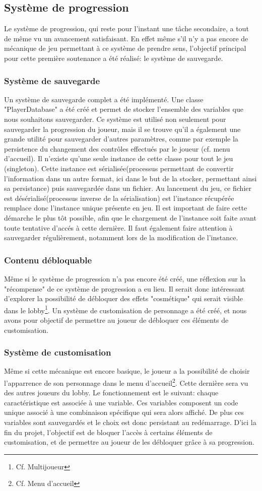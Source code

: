 \subsection{Système de progression}
    Le système de progression, qui reste pour l'instant une tâche secondaire, a tout de même vu un avancement satisfaisant. En effet même s'il n'y a pas encore de mécanique de jeu permettant à ce système de prendre sens, l'objectif principal pour cette première soutenance a été réalisé: le système de sauvegarde.
    \subsubsection{Système de sauvegarde}
    Un système de sauvegarde complet a été implémenté. Une classe "PlayerDatabase" a été créé et permet de stocker l'ensemble des variables que nous souhaitons sauvegarder. Ce système est utilisé non seulement pour sauvegarder la progression du joueur, mais il se trouve qu'il a également une grande utilité pour sauvegarder d'autres paramètres, comme par exemple la persistence du changement des contrôles effectués par le joueur (cf. menu d'accueil). Il n'existe qu'une seule instance de cette classe pour tout le jeu (singleton). Cette instance est sérialisée(processus permettant de convertir l'information dans un autre format, ici dans le but de la stocker, permettant ainsi sa persistance) puis sauvegardée dans un fichier. Au lancement du jeu, ce fichier est désérialisé(processus inverse de la sérialisation) est l'instance récupérée remplace donc l'instance unique présente en jeu. Il est important de faire cette démarche le plus tôt possible, afin que le chargement de l'instance soit faite avant toute tentative d'accés à cette dernière. Il faut également faire attention à sauvegarder régulièrement, notamment lors de la modification de l'instance. 
    \subsubsection{Contenu débloquable}
    Même si le système de progression n'a pas encore été créé, une réflexion sur la "récompense" de ce système de progression a eu lieu. Il serait donc intéressant d'explorer la possibilité de débloquer des effets "cosmétique" qui serait visible dans le lobby\footnote{Cf. Multijoueur}. Un système de customisation de personnage a été créé, et nous avons pour objectif de permettre au joueur de débloquer ces éléments de customisation.
    \subsubsection{Système de customisation}
    Même si cette mécanique est encore basique, le joueur a la possibilité de choisir l'apparrence de son personnage dans le menu d'accueil\footnote{Cf. Menu d'accueil}. Cette dernière sera vu des autres joueurs du lobby. Le fonctionnement est le suivant: chaque caractéristique est associée à une variable. Ces variables composent un code unique associé à une combinaison spécifique qui sera alors affiché. De plus ces variables sont sauvegardés et le choix est donc persistant au redémarrage. D'ici la fin du projet, l'objectif est de bloquer l'accès à certains éléments de customisation, et de permettre au joueur de les débloquer grâce à sa progression.